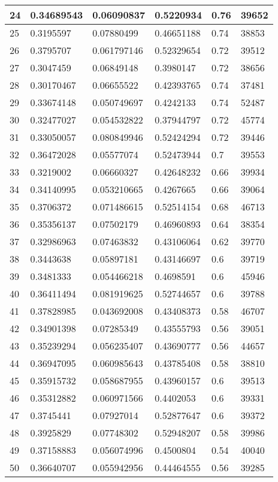 \begin{longtable}{|l|l|l|l|l|l|}
24 & 0.34689543 & 0.06090837 & 0.5220934 & 0.76 & 39652 \\ \hline 
25 & 0.3195597 & 0.07880499 & 0.46651188 & 0.74 & 38853 \\ \hline 
26 & 0.3795707 & 0.061797146 & 0.52329654 & 0.72 & 39512 \\ \hline 
27 & 0.3047459 & 0.06849148 & 0.3980147 & 0.72 & 38656 \\ \hline 
28 & 0.30170467 & 0.06655522 & 0.42393765 & 0.74 & 37481 \\ \hline 
29 & 0.33674148 & 0.050749697 & 0.4242133 & 0.74 & 52487 \\ \hline 
30 & 0.32477027 & 0.054532822 & 0.37944797 & 0.72 & 45774 \\ \hline 
31 & 0.33050057 & 0.080849946 & 0.52424294 & 0.72 & 39446 \\ \hline 
32 & 0.36472028 & 0.05577074 & 0.52473944 & 0.7 & 39553 \\ \hline 
33 & 0.3219002 & 0.06660327 & 0.42648232 & 0.66 & 39934 \\ \hline 
34 & 0.34140995 & 0.053210665 & 0.4267665 & 0.66 & 39064 \\ \hline 
35 & 0.3706372 & 0.071486615 & 0.52514154 & 0.68 & 46713 \\ \hline 
36 & 0.35356137 & 0.07502179 & 0.46960893 & 0.64 & 38354 \\ \hline 
37 & 0.32986963 & 0.07463832 & 0.43106064 & 0.62 & 39770 \\ \hline 
38 & 0.3443638 & 0.05897181 & 0.43146697 & 0.6 & 39719 \\ \hline 
39 & 0.3481333 & 0.054466218 & 0.4698591 & 0.6 & 45946 \\ \hline 
40 & 0.36411494 & 0.081919625 & 0.52744657 & 0.6 & 39788 \\ \hline 
41 & 0.37828985 & 0.043692008 & 0.43408373 & 0.58 & 46707 \\ \hline 
42 & 0.34901398 & 0.07285349 & 0.43555793 & 0.56 & 39051 \\ \hline 
43 & 0.35239294 & 0.056235407 & 0.43690777 & 0.56 & 44657 \\ \hline 
44 & 0.36947095 & 0.060985643 & 0.43785408 & 0.58 & 38810 \\ \hline 
45 & 0.35915732 & 0.058687955 & 0.43960157 & 0.6 & 39513 \\ \hline 
46 & 0.35312882 & 0.060971566 & 0.4402053 & 0.6 & 39331 \\ \hline 
47 & 0.3745441 & 0.07927014 & 0.52877647 & 0.6 & 39372 \\ \hline 
48 & 0.3925829 & 0.07748302 & 0.52948207 & 0.58 & 39986 \\ \hline 
49 & 0.37158883 & 0.056074996 & 0.4500804 & 0.54 & 40040 \\ \hline 
50 & 0.36640707 & 0.055942956 & 0.44464555 & 0.56 & 39285 \\ \hline 
\end{longtable}